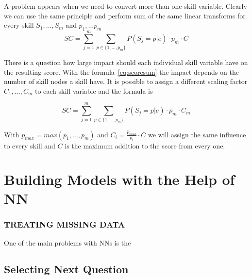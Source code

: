 A problem appears when we need to convert more than one skill variable. Clearly we can use the same principle and perform sum of the same linear transforms for every skill $S_1,\ldots, S_m$ and $p_1,\ldots p_m$
\begin{equation}
SC = \sum_{j=1}^m{\sum_{p\in \{1,\ldots,p_m\}}{P(S_j=p|e)\cdot p_m\cdot C}} 
\label{eq:scoresum}
\end{equation}

There is a question how large impact should each individual skill variable have on the resulting score. With the formula~\ref{eq:scoresum} the impact depends on the number of skill nodes a skill have. It is possible to assign a different scaling factor $C_1,\ldots, C_m$ to each skill variable and the formula is

\begin{equation}
SC = \sum_{j=1}^m{\sum_{p\in \{1,\ldots,p_m\}}{P(S_j=p|e)\cdot p_m\cdot C_m}} 
\label{eq:scoresum2}
\end{equation}

With $p_{max} = max(p_1,\ldots, p_m)$ and $C_i = \frac{p_{max}}{p_i}\cdot C$ we will assign the same influence to every skill and $C$ is the maximum addition to the score from every one.

\section{Building Models with the Help of NN}

\subsubsection{TREATING MISSING DATA}
One of the main problems with NNs is the 

\subsection{Selecting Next Question}

